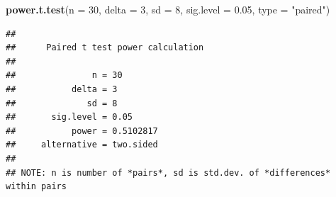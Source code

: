 \documentclass[
]{book}
\newenvironment{Shaded}{\begin{snugshade}}{\end{snugshade}}
\newcommand{\AttributeTok}[1]{\textcolor[rgb]{0.13,0.29,0.53}{#1}}
\newcommand{\DecValTok}[1]{\textcolor[rgb]{0.00,0.00,0.81}{#1}}
\newcommand{\FloatTok}[1]{\textcolor[rgb]{0.00,0.00,0.81}{#1}}
\newcommand{\FunctionTok}[1]{\textcolor[rgb]{0.13,0.29,0.53}{\textbf{#1}}}
\newcommand{\NormalTok}[1]{#1}
\newcommand{\StringTok}[1]{\textcolor[rgb]{0.31,0.60,0.02}{#1}}
\begin{document}
\begin{Shaded}
\begin{Highlighting}[]
\FunctionTok{power.t.test}\NormalTok{(}\AttributeTok{n =} \DecValTok{30}\NormalTok{, }\AttributeTok{delta =} \DecValTok{3}\NormalTok{, }\AttributeTok{sd =} \DecValTok{8}\NormalTok{, }\AttributeTok{sig.level =} \FloatTok{0.05}\NormalTok{, }\AttributeTok{type =} \StringTok{"paired"}\NormalTok{)}
\end{Highlighting}
\end{Shaded}

\begin{verbatim}
## 
##      Paired t test power calculation 
## 
##               n = 30
##           delta = 3
##              sd = 8
##       sig.level = 0.05
##           power = 0.5102817
##     alternative = two.sided
## 
## NOTE: n is number of *pairs*, sd is std.dev. of *differences* within pairs
\end{verbatim}

  
\end{document}

